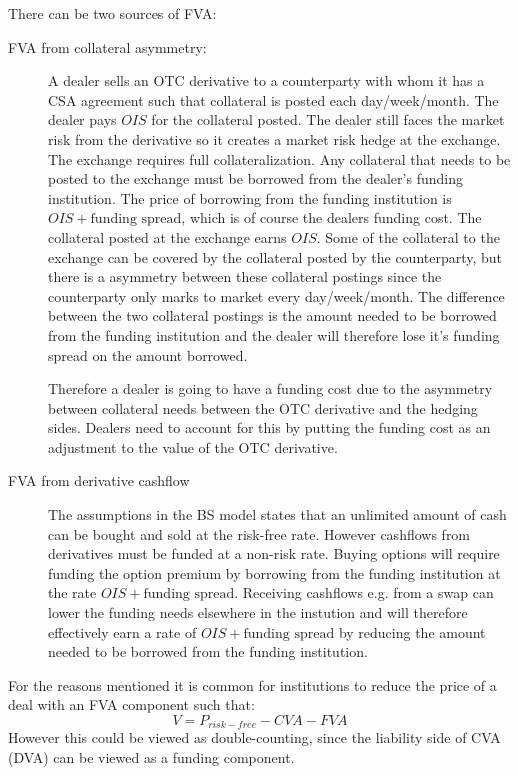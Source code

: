\documentclass[10pt,a4paper]{article}
\begin{document}
        There can be two sources of FVA:
        \begin{description}
            \item[FVA from collateral asymmetry:] A dealer sells an OTC derivative to a counterparty with whom it has a CSA agreement such that collateral is posted each day/week/month. The dealer pays $OIS$ for the collateral posted. The dealer still faces the market risk from the derivative so it creates a market risk hedge at the exchange. The exchange requires full collateralization. Any collateral that needs to be posted to the exchange must be borrowed from the dealer's funding institution. The price of borrowing from the funding institution is $OIS + \text{funding spread}$, which is of course the dealers funding cost. The collateral posted at the exchange earns $OIS$. Some of the collateral to the exchange can be covered by the collateral posted by the counterparty, but there is a asymmetry between these collateral postings since the counterparty only marks to market every day/week/month. The difference between the two collateral postings is the amount needed to be borrowed from the funding institution and the dealer will therefore lose it's funding spread on the amount borrowed. 
            
            Therefore a dealer is going to have a funding cost due to the asymmetry between collateral needs between the OTC derivative and the hedging sides. Dealers need to account for this by putting the funding cost as an adjustment to the value of the OTC derivative.

            \item[FVA from derivative cashflow] The assumptions in the BS model states that an unlimited amount of cash can be bought and sold at the risk-free rate. However cashflows from derivatives must be funded at a non-risk rate. Buying options will require funding the option premium by borrowing from the funding institution at the rate $OIS + \text{funding spread}$. Receiving cashflows e.g. from a swap can lower the funding needs elsewhere in the instution and will therefore effectively earn a rate of $OIS + \text{funding spread}$ by reducing the amount needed to be borrowed from the funding institution.
        \end{description}

        For the reasons mentioned it is common for institutions to reduce the price of a deal with an FVA component such that:
            \begin{equation}
                V = P_{risk-free} - CVA - FVA
            \end{equation}
        However this could be viewed as double-counting, since the liability side of CVA (DVA) can be viewed as a funding component.  
\end{document}
